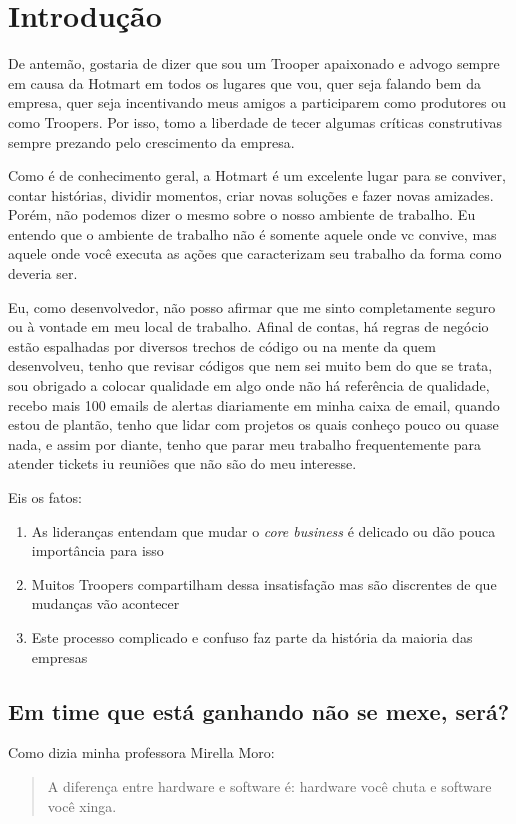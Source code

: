 \chapter{Introdução}

De antemão, gostaria de dizer que sou um Trooper apaixonado e advogo sempre em causa da Hotmart em todos os lugares que vou, quer seja falando bem da empresa, quer seja incentivando meus amigos a participarem como produtores ou como Troopers. Por isso, tomo a liberdade de tecer algumas críticas construtivas sempre prezando pelo crescimento da empresa.

Como é de conhecimento geral, a Hotmart é um excelente lugar para se conviver, contar histórias, dividir momentos, criar novas soluções e fazer novas amizades. Porém, não podemos dizer o mesmo sobre o nosso ambiente de trabalho. Eu entendo que o ambiente de trabalho não é somente aquele onde vc convive, mas aquele onde você executa as ações que caracterizam seu trabalho da forma como deveria ser.

Eu, como desenvolvedor, não posso afirmar que me sinto completamente seguro ou à vontade em meu local de trabalho. Afinal de contas, há regras de negócio estão espalhadas por diversos trechos de código ou na mente da quem desenvolveu, tenho que revisar códigos que nem sei muito bem do que se trata, sou obrigado a colocar qualidade em algo onde não há referência de qualidade, recebo mais 100 emails de alertas diariamente em minha caixa de email, quando estou de plantão, tenho que lidar com projetos os quais conheço pouco ou quase nada, e assim por diante, tenho que parar meu trabalho frequentemente para atender tickets iu reuniões que não são do meu interesse. 

Eis os fatos:
\begin{enumerate}
    \item As lideranças entendam que mudar o \emph{core business} é delicado ou dão pouca importância para isso
    \item Muitos Troopers compartilham dessa insatisfação mas são discrentes de que mudanças vão acontecer
    \item Este processo complicado e confuso faz parte da história da maioria das empresas
\end{enumerate}

\section{Em time que está ganhando não se mexe, será?}
Como dizia minha professora Mirella Moro: 
\begin{quote}
A diferença entre hardware e software é: hardware você chuta e software você xinga.
\end{quote}



